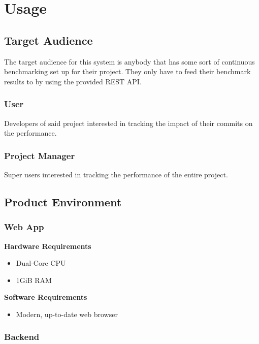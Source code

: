 \section{Usage}

\subsection{Target Audience}

The target audience for this system is anybody that has some sort of continuous benchmarking set up for their project. They only have to feed their \glspl{benchmark result} to \parkview{} by using the provided \gls{REST API}.

\subsubsection*{User}

Developers of said project interested in tracking the impact of their commits on the performance.

\subsubsection*{Project Manager}

Super users interested in tracking the performance of the entire project.

\subsection{Product Environment}

\subsubsection*{Web App}

\textbf{Hardware Requirements}
\begin{itemize}
    \item Dual-Core CPU
    \item 1GiB RAM
\end{itemize}

\textbf{Software Requirements}
\begin{itemize}
    \item Modern, up-to-date web browser
\end{itemize}

\subsubsection*{Backend}

